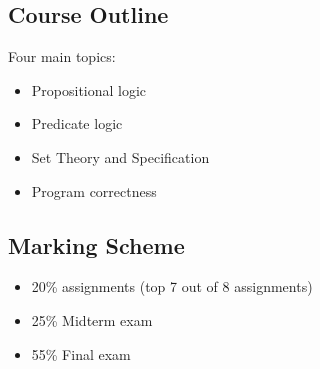     \subsection{Course Outline}
      Four main topics:
      \begin{itemize}
        \item Propositional logic
        \item Predicate logic
        \item Set Theory and Specification
        \item Program correctness
      \end{itemize}

    \subsection{Marking Scheme}
      \begin{itemize}
        \item 20\% assignments (top 7 out of 8 assignments)
        \item 25\% Midterm exam
        \item 55\% Final exam
      \end{itemize}

